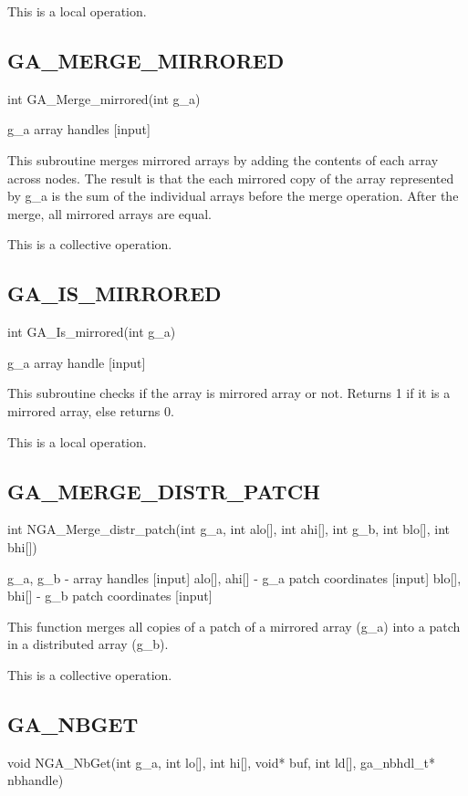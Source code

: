 This is a local operation.


\subsection*{GA\_MERGE\_MIRRORED}

int GA\_Merge\_mirrored(int g\_a)

g\_a array handles {[}input{]}

This subroutine merges mirrored arrays by adding the contents of each
array across nodes. The result is that the each mirrored copy of the
array represented by g\_a is the sum of the individual arrays before
the merge operation. After the merge, all mirrored arrays are equal.

This is a collective operation.


\subsection*{GA\_IS\_MIRRORED}

int GA\_Is\_mirrored(int g\_a)

g\_a array handle {[}input{]}

This subroutine checks if the array is mirrored array or not. Returns
1 if it is a mirrored array, else returns 0.

This is a local operation.


\subsection*{GA\_MERGE\_DISTR\_PATCH}

int NGA\_Merge\_distr\_patch(int g\_a, int alo{[}{]}, int ahi{[}{]},
int g\_b, int blo{[}{]}, int bhi{[}{]})

g\_a, g\_b - array handles {[}input{]} alo{[}{]}, ahi{[}{]} - g\_a
patch coordinates {[}input{]} blo{[}{]}, bhi{[}{]} - g\_b patch coordinates
{[}input{]}

This function merges all copies of a patch of a mirrored array (g\_a)
into a patch in a distributed array (g\_b).

This is a collective operation. 


\subsection*{GA\_NBGET}

void NGA\_NbGet(int g\_a, int lo{[}{]}, int hi{[}{]}, void{*} buf,
int ld{[}{]}, ga\_nbhdl\_t{*} nbhandle)

